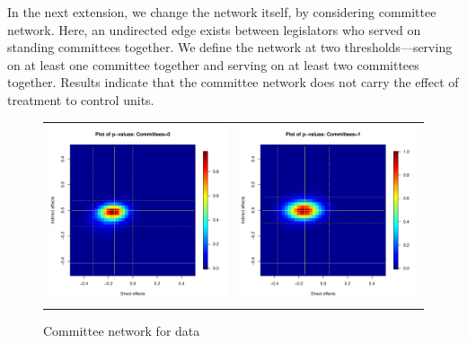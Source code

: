 \documentclass[12pt]{article}
\begin{document}
In the next extension, we change the network itself, by considering committee network. Here, an undirected edge exists between legislators who served on standing committees together.  We define the network at two thresholds---serving on at least one committee together and serving on at least two committees together. Results indicate that the committee network does not carry the effect of treatment to control units.

\begin{figure}
	\centering
	\begin{tabular}{cc}
	\includegraphics[scale=0.45]{./images/pval_plot_coppock_committee_1ormore.pdf} &
	\includegraphics[scale=0.45]{./images/pval_plot_coppock_committee_2ormore.pdf}
	\end{tabular}
	\caption{Committee network for  \citet{butler2011can} data}
\end{figure}
\end{document}
